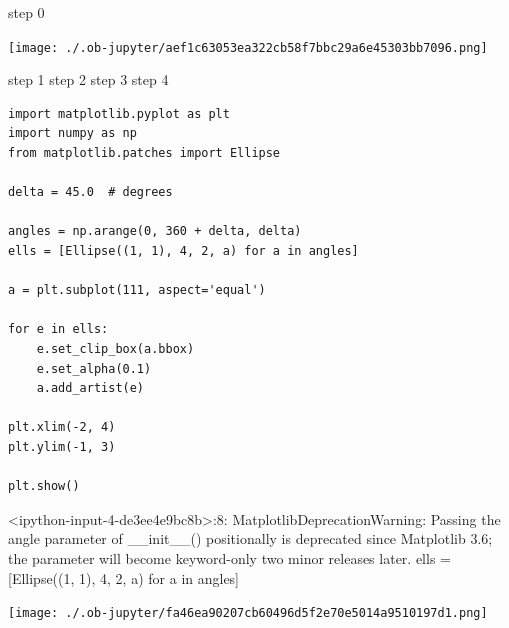 \documentclass[11pt]{article}
\begin{document}
step 0
\begin{center}
\texttt{[image: ./.ob-jupyter/aef1c63053ea322cb58f7bbc29a6e45303bb7096.png]}
\end{center}
step 1
step 2
step 3
step 4


\begin{verbatim}
import matplotlib.pyplot as plt
import numpy as np
from matplotlib.patches import Ellipse

delta = 45.0  # degrees

angles = np.arange(0, 360 + delta, delta)
ells = [Ellipse((1, 1), 4, 2, a) for a in angles]

a = plt.subplot(111, aspect='equal')

for e in ells:
    e.set_clip_box(a.bbox)
    e.set_alpha(0.1)
    a.add_artist(e)

plt.xlim(-2, 4)
plt.ylim(-1, 3)

plt.show()
\end{verbatim}

<ipython-input-4-de3ee4e9bc8b>:8: MatplotlibDeprecationWarning: Passing the angle parameter of \_\_init\_\_() positionally is deprecated since Matplotlib 3.6; the parameter will become keyword-only two minor releases later.
  ells = [Ellipse((1, 1), 4, 2, a) for a in angles]
\begin{center}
\texttt{[image: ./.ob-jupyter/fa46ea90207cb60496d5f2e70e5014a9510197d1.png]}
\end{center}
\end{document}
